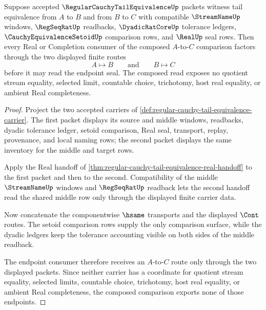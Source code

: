 \begin{theorem}
\label{thm:regular-cauchy-tail-equivalence-composition}
Suppose accepted $\RegularCauchyTailEquivalenceUp$ packets witness tail equivalence from $A$ to $B$ and from $B$ to $C$ with compatible $\StreamNameUp$ windows, $\RegSeqRatUp$ readbacks, $\DyadicRatCoreUp$ tolerance ledgers, $\CauchyEquivalenceSetoidUp$ comparison rows, and $\RealUp$ seal rows. Then every Real or Completion consumer of the composed $A$-to-$C$ comparison factors through the two displayed finite routes
$$
A \longmapsto B
\qquad\text{and}\qquad
B \longmapsto C
$$
before it may read the endpoint seal. The composed read exposes no quotient stream equality, selected limit, countable choice, trichotomy, host real equality, or ambient Real completeness.
\end{theorem}
\begin{proof}
Project the two accepted carriers of \autoref{def:regular-cauchy-tail-equivalence-carrier}. The first packet displays its source and middle windows, readbacks, dyadic tolerance ledger, setoid comparison, Real seal, transport, replay, provenance, and local naming rows; the second packet displays the same inventory for the middle and target rows.

Apply the Real handoff of \autoref{thm:regular-cauchy-tail-equivalence-real-handoff} to the first packet and then to the second. Compatibility of the middle $\StreamNameUp$ windows and $\RegSeqRatUp$ readback lets the second handoff read the shared middle row only through the displayed finite carrier data.

Now concatenate the componentwise $\hsame$ transports and the displayed $\Cont$ routes. The setoid comparison rows supply the only comparison surface, while the dyadic ledgers keep the tolerance accounting visible on both sides of the middle readback.

The endpoint consumer therefore receives an $A$-to-$C$ route only through the two displayed packets. Since neither carrier has a coordinate for quotient stream equality, selected limits, countable choice, trichotomy, host real equality, or ambient Real completeness, the composed comparison exports none of those endpoints.
\end{proof}


